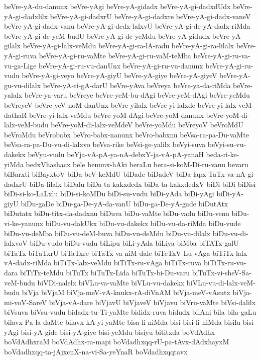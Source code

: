 {beVre-yA-du-danunx
beVre-yAgi
beVre-yA-gidadx
beVre-yA-gi-dadxdUdx
beVre-yA-gi-dadxlilx
beVre-yA-gi-dadxrU
beVre-yA-gi-dadxre
beVre-yA-gi-dadx-vaneV
beVre-yA-gi-dadx-vanu
beVre-yA-gi-dedx-lalxvU
beVre-yA-gi-de-yA-dadx-riMda
beVre-yA-gi-de-yeM-budU
beVre-yA-gi-de-yeMdu
beVre-yA-gidudx
beVre-yA-gilalx
beVre-yA-gi-lalx-veMdu
beVre-yA-gi-ra-lA-radu
beVre-yA-gi-ra-lilalx
beVre-yA-gi-ruva
beVre-yA-gi-ru-vaMte
beVre-yA-gi-ru-vaM-teMba
beVre-yA-gi-ru-va-vu-ga-Lige
beVre-yA-gi-ru-vu-danUnx
beVre-yA-gi-ru-vu-danunx
beVre-yA-gi-ru-vudu
beVre-yA-gi-veyo
beVre-yA-giyU
beVre-yA-giye
beVre-yA-giyeV
beVre-yA-gu-vu-dilalx
beVre-yA-ri-gA-darU
beVre-yAva
beVreya
beVre-ya-da-riMda
beVre-yalalx
beVre-ya-varu
beVreye
beVre-yeM-bu-dAgi
beVre-yeM-dAgi
beVre-yeMdu
beVreyeV
beVre-yeV-noM-danUnx
beVre-yilalx
beVre-yi-lalxde
beVre-yi-lalx-veM-dathaR
beVre-yi-lalx-veMdu
beVre-yoM-dAgi
beVre-yoM-danunx
beVre-yoM-di-lalx-veM-budu
beVre-yoM-di-lalx-veMdeV
beVre-yoMdu
beVreyoV
beVroMdU
beVroMdu
beVrobabx
beVro-babx-nanunx
beVro-babxnu
beVsa-ra-pa-Du-vaMte
beVsa-ra-pa-Du-vu-di-lalxvo
beVsa-rike
beVsi-ge-yalilx
beVyi-suva
beVyi-su-vu-dakekx
beVyu-vudu
beYja-vA-pA-ya-nA-debxY-ja-vA-pA-yanaH
beda-ri-ke-yiMda
bedxVhashacx
bele
benunx-hAki
beraLu
bera-si-koM-Di-ru-vanu
bevaru
biBarxti
biBayxtoV
biDa-beV-keMdU
biDade
biDadeV
biDa-lapx-TaTx-va-nA-gi-dadxrU
biDa-lilalx
biDalu
biDa-ta-kakxdedx
biDa-ta-kakxdedxV
biDi-biDi
biDisi
biDi-si-ko-LaLxlu
biDi-si-koMDu
biDi-su-vudu
biDi-yAda
biDi-yAgi
biDi-yA-giyU
biDu-gaDe
biDu-ga-De-yA-da-vanU
biDu-ga-De-yA-gade
biDutAtx
biDutatx
biDu-titx-da-dadxnu
biDuva
biDu-vaMte
biDu-vadu
biDu-venu
biDu-vi-ke-yanunx
biDu-vu-dakUkx
biDu-vu-dakekx
biDu-vu-da-riMda
biDu-vude
biDu-vu-deMba
biDu-vu-deM-buva
biDu-vu-deMdu
biDu-vu-dilalx
biDu-vu-di-lalxvoV
biDu-vudo
biDu-vudu
biLipu
biLi-yAda
biLiya
biMba
biTATx-galU
biTaTx
biTaTxrU
biTaTxre
biTaTx-va-niM-dale
biTeTxV-Lu-vAga
biTiTx-lalx-vA-dadx-riMda
biTiTx-lalx-veMdu
biTiTx-ru-vAga
biTiTx-ruva
biTiTx-ru-vu-dara
biTiTx-teMdu
biTuTx
biTuTx-Lida
biTuTx-bi-Du-varu
biTuTx-vi-sheV-Sa-veM-budu
biVDi-nalelx
biVLu-va-vaMte
biVLu-vu-dakekx
biVLu-vu-di-lalx-veM-budu
biVja
biVjaM
biVja-meV-vA-knukx-rA-diVnAM
biVja-meV-vAsutx
biVja-mi-voV-SareV
biVja-vA-dare
biVjavU
biVjaveV
biVjavu
biVru-vaMte
biVsi-dalilx
biVsuva
biVsu-vudu
bidadx-tu-Ti-yaMte
bididx-ruva
bidudx
bilAni
bila
bila-gaLu
bilavx-Pa-la-daMte
bilavx-kA-yi-yaMte
bisa-li-niMda
bisi
bisi-li-niMda
bisilu
bisi-yAgi
bisi-yA-gide
bisi-yA-giye
bisi-yeMdu
bisiyu
bititxda
boVdAdhx
boVdAdhxraM
boVdAdhx-ra-mapi
boVdadhxqq-rU-pa-tAvx-dAdxhayxM
boVdadhxqq-ta-jAjxcnX-na-vi-Sa-yeYnaR
boVdadhxqqtavx
}
